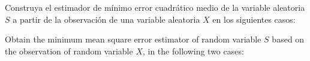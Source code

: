 \ifspanish

\question  Construya el estimador de mínimo error cuadrático medio de la variable aleatoria $S$ a partir de la observación de una variable aleatoria $X$ en los siguientes casos:

\begin{parts}
\part 
\[
p_{X,S}(x,s) = \left \{
  \begin{array}{cc}
    1, &
         0 \le x \le 1, ~~ \quad 0\le s \le 1 \\
0,  & \mbox{en el resto}
  \end{array}
\right.
\]
  \part 

\[
p_{X,S}(x,s) = \left \{
  \begin{array}{cc}
    2, &  0 \leq s \leq 1-x, ~~ 0 \leq x \leq 1 \\
0, & \mbox{en el resto}
  \end{array}
\right.
\]

\end{parts}
 
\begin{solution}

 \end{solution}

\else

\question  Obtain the minimum mean square error estimator of random variable $S$ based on the observation of random variable $X$, in the following two cases:

